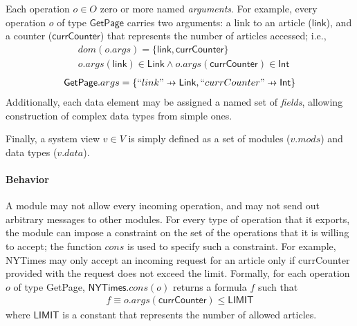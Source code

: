 Each operation $o \in O$  zero or more
named \textit{arguments}. For example, every operation $o$ of type
$\textsf{GetPage}$ carries two arguments: a link to an article
($\textsf{link}$), and a counter ($\textsf{currCounter}$) that
represents the number of articles accessed; i.e.,
\begin{align*}
  &dom(o.args) = \{ \textsf{link}, \textsf{currCounter} \} \\
  &o.args(\textsf{link}) \in \textsf{Link} \land
  o.args(\textsf{currCounter}) \in \textsf{Int}
\end{align*}
\begin{align*}
  \textsf{GetPage}.args = \{ ``link" \pfun \textsf{Link}, ``currCounter" \pfun \textsf{Int} \}
\end{align*}
Additionally, each data element may be assigned a named set of
\textit{fields}, allowing construction of complex data types from
simple ones.

Finally, a system view $v \in V$ is simply defined as a set of modules
($v.mods$) and data types ($v.data$). 

\paragraph{\textbf{Behavior}} A module may not allow every incoming
operation, and may not send out arbitrary messages to other
modules. For every type of operation that it exports, the module can
impose a constraint on the set of the operations that it is willing to
accept; the function $cons$ is used to specify such a constraint. For
example, \textsf{NYTimes} may only accept an incoming request for an
article only if \textsf{currCounter} provided with the request does
not exceed the limit. Formally, for each operation $o$ of type
\textsf{GetPage}, $\textsf{NYTimes}.cons(o)$ returns a formula $f$
such that
\begin{align*}
f \equiv o.args(\textsf{currCounter}) \leq \textsf{LIMIT}
\end{align*}
where $\textsf{LIMIT}$ is a constant that represents the number of
allowed articles.


